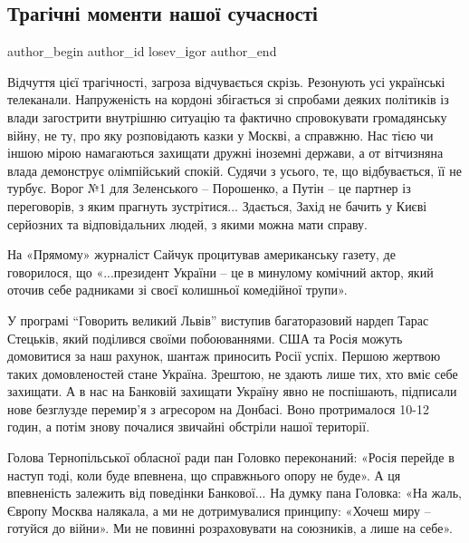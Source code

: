  
 
 
 
 
\subsection{Трагічні моменти нашої сучасності}
\label{sec:03_01_2022.stz.news.ua.den.1.tragichni_momenty_suchasnosti}

\ifcmt
 author_begin
   author_id losev_іgor
 author_end
\fi

Відчуття цієї трагічності, загроза відчувається скрізь. Резонують усі
українські телеканали. Напруженість на кордоні збігається зі спробами деяких
політиків із влади загострити внутрішню ситуацію та фактично спровокувати
громадянську війну, не ту, про яку розповідають казки у Москві, а справжню. Нас
тією чи іншою мірою намагаються захищати дружні іноземні держави, а от
вітчизняна влада демонструє олімпійський спокій. Судячи з усього, те, що
відбувається, її не турбує. Ворог №1 для Зеленського – Порошенко, а Путін – це
партнер із переговорів, з яким прагнуть зустрітися... Здається, Захід не бачить у
Києві серйозних та відповідальних людей, з якими можна мати справу.

На «Прямому» журналіст Сайчук процитував американську газету, де говорилося, що
«...президент України – це в минулому комічний актор, який оточив себе радниками
зі своєї колишньої комедійної трупи».

У програмі \enquote{Говорить великий Львів} виступив багаторазовий нардеп Тарас
Стецьків, який поділився своїми побоюваннями. США та Росія можуть домовитися за
наш рахунок, шантаж приносить Росії успіх. Першою жертвою таких домовленостей
стане Україна. Зрештою, не здають лише тих, хто вміє себе захищати. А в нас на
Банковій захищати Україну явно не поспішають, підписали нове безглузде
перемир'я з агресором на Донбасі. Воно протрималося 10-12 годин, а потім знову
почалися звичайні обстріли нашої території.

Голова Тернопільської обласної ради пан Головко переконаний: «Росія перейде в
наступ тоді, коли буде впевнена, що справжнього опору не буде». А ця
впевненість залежить від поведінки Банкової... На думку пана Головка: «На жаль,
Європу Москва налякала, а ми не дотримувалися принципу: «Хочеш миру – готуйся
до війни». Ми не повинні розраховувати на союзників, а лише на себе».

